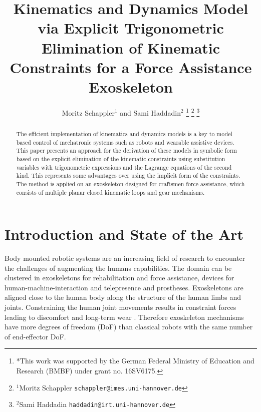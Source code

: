 \documentclass[letterpaper, 10 pt, conference]{ieeeconf}  %
\title{\LARGE \bf
Kinematics and Dynamics Model via Explicit Trigonometric Elimination of Kinematic Constraints for a Force Assistance Exoskeleton
}
\author{Moritz Schappler$^{1}$ and Sami Haddadin$^{2}$%
\thanks{*This work was supported by the German Federal Ministry of Education and Research (BMBF) under grant no. 16SV6175.}%
\thanks{$^{1}$Moritz Schappler
        {\tt\small schappler@imes.uni-hannover.de}}%
\thanks{$^{2}$Sami Haddadin
        {\tt\small haddadin@irt.uni-hannover.de}}%
}
\begin{document}
\maketitle
\thispagestyle{empty}
\pagestyle{empty}


\begin{abstract}

The efficient implementation of kinematics and dynamics models is a key to model based control of mechatronic systems such as robots and wearable assistive devices.
This paper presents an approach for the derivation of these models in symbolic form based on the explicit elimination of the kinematic constraints using substitution variables with trigonometric expressions and the Lagrange equations of the second kind.
This represents some advantages over using the implicit form of the constraints.
%
The method is applied on an exoskeleton designed for craftsmen force assistance, which consists of multiple planar closed kinematic loops and gear mechanisms.

\end{abstract}

\section{Introduction and State of the Art}

Body mounted robotic systems are an increasing field of research to encounter the challenges of augmenting the humans capabilities.
The domain can be clustered in exoskeletons for rehabilitation and force assistance, devices for human-machine-interaction and telepresence and prostheses.
Exoskeletons are aligned close to the human body along the structure of the human limbs and joints.
Constraining the human joint movements results in constraint forces leading to discomfort and long-term wear \cite{Pons2008}.
%
Therefore exoskeleton mechanisms have more degrees of freedom (DoF) than classical robots with the same number of end-effector DoF.
\end{document}
